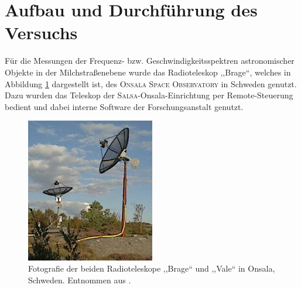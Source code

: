 \section{Aufbau und Durchführung des Versuchs}
\label{sec:Aufbau}
Für die Messungen der Frequenz- bzw. Geschwindigkeitsspektren astronomischer Objekte in der Milchstraßenebene wurde das Radioteleskop ,,Brage``, welches in Abbildung \ref{fig:Tesleskop} dargestellt ist, des \textsc{Onsala Space Observatory} in Schweden genutzt.
Dazu wurden das Teleskop der \textsc{Salsa}-Onsala-Einrichtung per Remote-Steuerung bedient und dabei interne Software der Forschungsanstalt genutzt.\\
\begin{figure}[H]
    \centering
    \includegraphics[width=0.5\textwidth]{pngplots/Teleskop.png}
    \caption[Radioteleskope]{Fotografie der beiden Radioteleskope ,,Brage`` und ,,Vale`` in Onsala, Schweden. Entnommen aus \cite{Usermanual}.}
    \label{fig:Tesleskop}
\end{figure}

